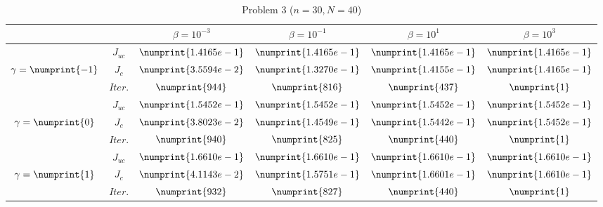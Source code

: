 \begin{table}
\begin{tabular}{ ||c|| c | c | c | c | c ||}
\hline
& & $\beta = 10^{-3}$ & $\beta = 10^{-1}$ & $\beta = 10^{1}$ & $\beta = 10^{3}$  \\
\hline
 & $J_{uc}$ & $\numprint{1.4165e-1}$ & $\numprint{1.4165e-1}$ & $\numprint{1.4165e-1}$ & $\numprint{1.4165e-1}$ \\
$\gamma= \numprint{-1}$  & $J_c$ & $\numprint{3.5594e-2}$ & $\numprint{1.3270e-1}$ & $\numprint{1.4155e-1}$ & $\numprint{1.4165e-1}$ \\
& $Iter.$ & $\numprint{944}$ & $\numprint{816}$ & $\numprint{437}$ & $\numprint{1}$ \\
\hline
 & $J_{uc}$ & $\numprint{1.5452e-1}$ & $\numprint{1.5452e-1}$ & $\numprint{1.5452e-1}$ & $\numprint{1.5452e-1}$ \\
$\gamma= \numprint{0}$  & $J_c$ & $\numprint{3.8023e-2}$ & $\numprint{1.4549e-1}$ & $\numprint{1.5442e-1}$ & $\numprint{1.5452e-1}$ \\
& $Iter.$ & $\numprint{940}$ & $\numprint{825}$ & $\numprint{440}$ & $\numprint{1}$ \\
\hline
 & $J_{uc}$ & $\numprint{1.6610e-1}$ & $\numprint{1.6610e-1}$ & $\numprint{1.6610e-1}$ & $\numprint{1.6610e-1}$ \\
$\gamma= \numprint{1}$  & $J_c$ & $\numprint{4.1143e-2}$ & $\numprint{1.5751e-1}$ & $\numprint{1.6601e-1}$ & $\numprint{1.6610e-1}$ \\
& $Iter.$ & $\numprint{932}$ & $\numprint{827}$ & $\numprint{440}$ & $\numprint{1}$ \\
\hline
\end{tabular}
\caption{Problem 3 ($n = 30,N = 40$)}
\label{TabS5:Prob3}
\end{table}